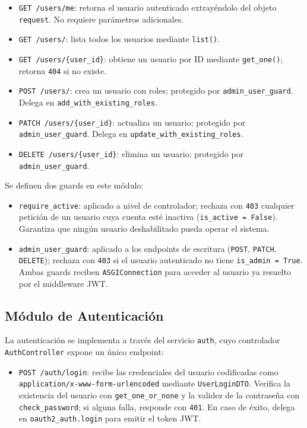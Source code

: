 \begin{itemize}
	\item \texttt{GET /users/me}: retorna el usuario autenticado extrayéndolo del objeto \texttt{request}. No requiere parámetros adicionales.
	\item \texttt{GET /users/}: lista todos los usuarios mediante \texttt{list()}.
	\item \texttt{GET /users/\{user\_id\}}: obtiene un usuario por ID mediante \texttt{get\_one()}; retorna \texttt{404} si no existe.
	\item \texttt{POST /users/}: crea un usuario con roles; protegido por \texttt{admin\_user\_guard}. Delega en \texttt{add\_with\_existing\_roles}.
	\item \texttt{PATCH /users/\{user\_id\}}: actualiza un usuario; protegido por \texttt{admin\_user\_guard}. Delega en \texttt{update\_with\_existing\_roles}.
	\item \texttt{DELETE /users/\{user\_id\}}: elimina un usuario; protegido por \texttt{admin\_user\_guard}.
\end{itemize}

Se definen dos guards en este módulo:

\begin{itemize}
	\item \texttt{require\_active}: aplicado a nivel de controlador; rechaza con \texttt{403} cualquier petición de un usuario cuya cuenta esté inactiva (\texttt{is\_active = False}). Garantiza que ningún usuario deshabilitado pueda operar el sistema.
	\item \texttt{admin\_user\_guard}: aplicado a los endpoints de escritura (\texttt{POST}, \texttt{PATCH}, \texttt{DELETE}); rechaza con \texttt{403} si el usuario autenticado no tiene \texttt{is\_admin = True}. Ambas guards reciben \texttt{ASGIConnection} para acceder al usuario ya resuelto por el middleware JWT.
\end{itemize}

\subsection{Módulo de Autenticación}\label{sec:backend_auth}

La autenticación se implementa a través del servicio \texttt{auth}, cuyo controlador \texttt{AuthController} expone un único endpoint:

\begin{itemize}
	\item \texttt{POST /auth/login}: recibe las credenciales del usuario codificadas como \texttt{application/x-www-form-urlencoded} mediante \texttt{UserLoginDTO}. Verifica la existencia del usuario con \texttt{get\_one\_or\_none} y la validez de la contraseña con \texttt{check\_password}; si alguna falla, responde con \texttt{401}. En caso de éxito, delega en \texttt{oauth2\_auth.login} para emitir el token JWT.
\end{itemize}

